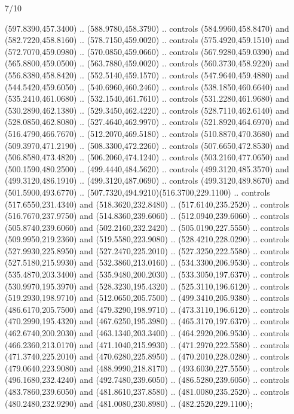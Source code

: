 \begin{flagdescription}{7/10}
\begin{scope}[xshift=0.5\flaglength]
\begin{scope}[scale=0.00185\flagwidth,yshift=245mm,xshift=-43.7mm]
\begin{scope}[y=-0.8pt, x=0.8pt, inner sep=0pt, outer sep=0pt]
\begin{scope}[shift={(-344.0678,183.89831)},draw=brown]
\begin{scope}[line width=0.897\lw]
  (597.8390,457.3400) .. (588.9780,458.3790) .. controls (584.9960,458.8470) and
  (582.7220,458.8160) .. (578.7150,459.0020) .. controls (575.4920,459.1510) and
  (572.7070,459.0980) .. (570.0850,459.0660) .. controls (567.9280,459.0390) and
  (565.8800,459.0500) .. (563.7880,459.0020) .. controls (560.3730,458.9220) and
  (556.8380,458.8420) .. (552.5140,459.1570) .. controls (547.9640,459.4880) and
  (544.5420,459.6050) .. (540.6960,460.2460) .. controls (538.1850,460.6640) and
  (535.2410,461.0680) .. (532.1540,461.7610) .. controls (531.2280,461.9680) and
  (530.2890,462.1380) .. (529.3450,462.4220) .. controls (528.7110,462.6140) and
  (528.0850,462.8080) .. (527.4640,462.9970) .. controls (521.8920,464.6970) and
  (516.4790,466.7670) .. (512.2070,469.5180) .. controls (510.8870,470.3680) and
  (509.3970,471.2190) .. (508.3300,472.2260) .. controls (507.6650,472.8530) and
  (506.8580,473.4820) .. (506.2060,474.1240) .. controls (503.2160,477.0650) and
  (500.1590,480.2500) .. (499.4440,484.5620) .. controls (499.3120,485.3570) and
  (499.3120,486.1910) .. (499.3120,487.0690) .. controls (499.3120,489.8670) and
  (501.5900,493.6770) .. (507.7320,494.9210)(516.3700,229.1100) .. controls
  (517.6550,231.4340) and (518.3620,232.8480) .. (517.6140,235.2520) .. controls
  (516.7670,237.9750) and (514.8360,239.6060) .. (512.0940,239.6060) .. controls
  (505.8740,239.6060) and (502.2160,232.2420) .. (505.0190,227.5550) .. controls
  (509.9950,219.2360) and (519.5580,223.9080) .. (528.4210,228.0290) .. controls
  (527.9930,225.8950) and (527.2470,225.2010) .. (527.3250,222.5580) .. controls
  (527.5180,215.9930) and (532.3860,213.0160) .. (534.3300,206.9530) .. controls
  (535.4870,203.3400) and (535.9480,200.2030) .. (533.3050,197.6370) .. controls
  (530.9970,195.3970) and (528.3230,195.4320) .. (525.3110,196.6120) .. controls
  (519.2930,198.9710) and (512.0650,205.7500) .. (499.3410,205.9380) .. controls
  (486.6170,205.7500) and (479.3290,198.9710) .. (473.3110,196.6120) .. controls
  (470.2990,195.4320) and (467.6250,195.3980) .. (465.3170,197.6370) .. controls
  (462.6740,200.2030) and (463.1340,203.3400) .. (464.2920,206.9530) .. controls
  (466.2360,213.0170) and (471.1040,215.9930) .. (471.2970,222.5580) .. controls
  (471.3740,225.2010) and (470.6280,225.8950) .. (470.2010,228.0280) .. controls
  (479.0640,223.9080) and (488.9990,218.8170) .. (493.6030,227.5550) .. controls
  (496.1680,232.4240) and (492.7480,239.6050) .. (486.5280,239.6050) .. controls
  (483.7860,239.6050) and (481.8610,237.8580) .. (481.0080,235.2520) .. controls
  (480.2480,232.9290) and (481.0080,230.8980) .. (482.2520,229.1100);

\end{scope}
\end{scope}
\end{scope}
\end{scope}
\end{scope}
\end{flagdescription}
